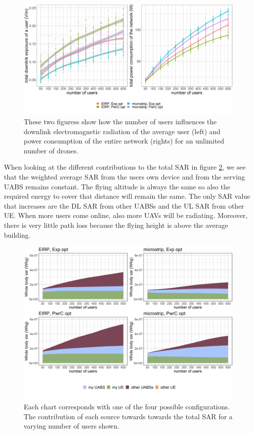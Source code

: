 \documentclass[twocolumn]{phdsymp} %
\begin{document}
\begin{figure}[h!]
  \includegraphics[width=\linewidth]{../results/s3/uvsdlAndPc.png}
  \caption{These two figuress show how the number of users influences the downlink electromagnetic radiation of the average user (left) and 
  power consumption of the entire network (rights) for an unlimited number of drones.}
  \label{fig:s3b_dlAndPC}
\end{figure}

When looking at the different contributions to the total \gls{SAR} in figure \ref{fig:s3b_fourSourcesMatrix}, 
we see that the weighted average 
\gls{SAR} from the users own device and from the serving \gls{UABS} remains constant. The flying altitude is always the same so 
also the required energy to cover that distance will remain the same. 
The only \gls{SAR} value that increases are the \gls{DL} \gls{SAR} from other \gls{UABS}s and the \gls{UL} \gls{SAR} from other \gls{UE}. 
When more users come online, also more \gls{UAV}s will be radiating. Moreover, there is very little path loss because the flying height is above the average building.

\begin{figure}[h!]
  \includegraphics[width=\linewidth]{../results/s3/uFourSources.png}
  \caption{Each chart corresponds with one of the four possible configurations. The contribution of each source towards towards the total 
  \gls{SAR} for a varying number of users shown.}
  \label{fig:s3b_fourSourcesMatrix}
\end{figure}
\end{document}
